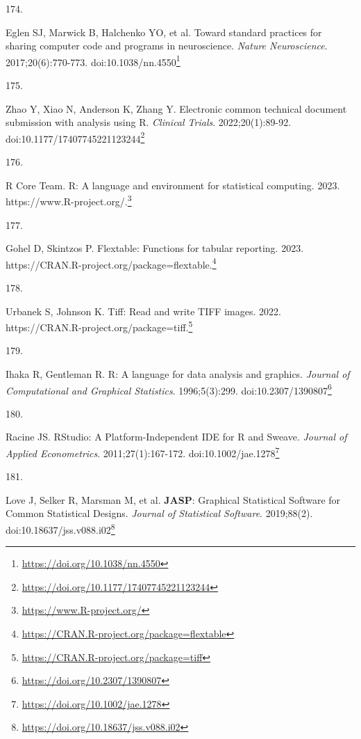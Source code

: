 \documentclass[
  a4paper,
]{book}
\newlength{\cslhangindent}
\newlength{\csllabelwidth}
\newlength{\cslentryspacingunit} %
\newenvironment{CSLReferences}[2] %
 {%
  \setlength{\parindent}{0pt}
  \ifodd #1
  \let\oldpar\par
  \def\par{\hangindent=\cslhangindent\oldpar}
  \fi
  \setlength{\parskip}{#2\cslentryspacingunit}
 }%
 {}
\newcommand{\CSLLeftMargin}[1]{\parbox[t]{\csllabelwidth}{#1}}
\newcommand{\CSLRightInline}[1]{\parbox[t]{\linewidth - \csllabelwidth}{#1}\break}
\renewcommand{\href}[2]{#2\footnote{\url{#1}}}
\begin{document}
\begin{CSLReferences}{0}{0}
\leavevmode{}%
\CSLLeftMargin{174. }%
\CSLRightInline{Eglen SJ, Marwick B, Halchenko YO, et al. Toward standard practices for sharing computer code and programs in neuroscience. \emph{Nature Neuroscience}. 2017;20(6):770-773. doi:\href{https://doi.org/10.1038/nn.4550}{10.1038/nn.4550}}

\leavevmode{}%
\CSLLeftMargin{175. }%
\CSLRightInline{Zhao Y, Xiao N, Anderson K, Zhang Y. Electronic common technical document submission with analysis using R. \emph{Clinical Trials}. 2022;20(1):89-92. doi:\href{https://doi.org/10.1177/17407745221123244}{10.1177/17407745221123244}}

\leavevmode{}%
\CSLLeftMargin{176. }%
\CSLRightInline{R Core Team. R: A language and environment for statistical computing. 2023. \href{https://www.R-project.org/}{https://www.R-project.org/.}}

\leavevmode{}%
\CSLLeftMargin{177. }%
\CSLRightInline{Gohel D, Skintzos P. Flextable: Functions for tabular reporting. 2023. \href{https://CRAN.R-project.org/package=flextable}{https://CRAN.R-project.org/package=flextable.}}

\leavevmode{}%
\CSLLeftMargin{178. }%
\CSLRightInline{Urbanek S, Johnson K. Tiff: Read and write TIFF images. 2022. \href{https://CRAN.R-project.org/package=tiff}{https://CRAN.R-project.org/package=tiff.}}

\leavevmode{}%
\CSLLeftMargin{179. }%
\CSLRightInline{Ihaka R, Gentleman R. R: A language for data analysis and graphics. \emph{Journal of Computational and Graphical Statistics}. 1996;5(3):299. doi:\href{https://doi.org/10.2307/1390807}{10.2307/1390807}}

\leavevmode{}%
\CSLLeftMargin{180. }%
\CSLRightInline{Racine JS. RStudio: A Platform{-}Independent IDE for R and Sweave. \emph{Journal of Applied Econometrics}. 2011;27(1):167-172. doi:\href{https://doi.org/10.1002/jae.1278}{10.1002/jae.1278}}

\leavevmode{}%
\CSLLeftMargin{181. }%
\CSLRightInline{Love J, Selker R, Marsman M, et al. {\textbf{JASP}}: Graphical Statistical Software for Common Statistical Designs. \emph{Journal of Statistical Software}. 2019;88(2). doi:\href{https://doi.org/10.18637/jss.v088.i02}{10.18637/jss.v088.i02}}


\end{CSLReferences}
\end{document}
